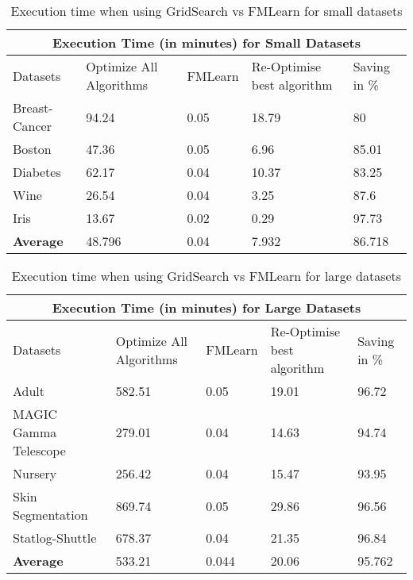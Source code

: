 \begin{table}[h!]
\centering 
\vspace*{+5pt}
 \begin{tabular}{ |p{1in}||p{1in}|p{0.7in}|p{1in}|p{0.8in}|  }
 \hline
 \multicolumn{5}{|c|}{Execution Time (in minutes) for Small Datasets} \\
 \hline
 Datasets & Optimize All Algorithms & FMLearn & Re-Optimise best algorithm & Saving in \%\\
 \hline
 Breast-Cancer & 94.24 & 0.05 & 18.79 & 80 \\
 \hline
 Boston & 47.36 & 0.05 & 6.96 & 85.01 \\
 \hline
 Diabetes & 62.17 & 0.04 & 10.37 & 83.25 \\
 \hline
 Wine & 26.54 & 0.04 & 3.25 & 87.6 \\
 \hline
 Iris & 13.67 & 0.02 & 0.29 & 97.73 \\
 \hline
 \hline
 \textbf{Average} & 48.796 & 0.04  & 7.932 & 86.718 \\
 \hline
\end{tabular}
\vspace*{+5pt}
\caption{Execution time when using GridSearch vs FMLearn for small datasets}
\label{table:1}
\end{table}
\vspace*{-10pt}

\begin{table}[h!]
\centering 
\vspace*{+5pt}
 \begin{tabular}{ |p{1.8in}||p{1in}|p{0.7in}|p{1in}|p{0.8in}|  }
 \hline
 \multicolumn{5}{|c|}{Execution Time (in minutes) for Large Datasets} \\
 \hline
 Datasets & Optimize All Algorithms & FMLearn & Re-Optimise best algorithm & Saving in \%\\
 \hline
 Adult & 582.51 & 0.05 & 19.01 & 96.72 \\
 \hline
 MAGIC Gamma Telescope & 279.01 & 0.04 & 14.63 & 94.74 \\
  \hline
 Nursery & 256.42 &  0.04 & 15.47 & 93.95 \\
 \hline
 Skin Segmentation & 869.74 & 0.05 & 29.86 & 96.56 \\
 \hline
 Statlog-Shuttle & 678.37 & 0.04 & 21.35 & 96.84 \\
 \hline
 \hline
 \textbf{Average} & 533.21 & 0.044 & 20.06 & 95.762 \\
 \hline
\end{tabular}
\vspace*{+5pt}
\caption{Execution time when using GridSearch vs FMLearn for large datasets}
\label{table:2}
\end{table}
\vspace*{-10pt}

